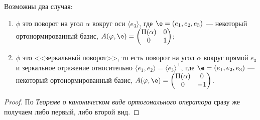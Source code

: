 \begin{Suggestion}
    Возможны два случая:
    
    \begin{enumerate}
        \item $\phi$ это поворот на угол $\alpha$ вокруг оси $\langle e_3 \rangle$, где $\e = (e_1, e_2, e_3)$ --- некоторый ортонормированный базис, $A(\phi, \e) = \begin{pmatrix}
        \Pi(\alpha) & 0 \\
        0 & 1
        \end{pmatrix}$;
        \item $\phi$ это <<зеркальный поворот>>, то есть поворот на угол $\alpha$ вокруг прямой $e_3$ и зеркальное отражение относительно $\langle e_1, e_2\rangle = \langle e_3\rangle^\perp$, где $\e = (e_1, e_2, e_3)$ --- некоторый ортонормированный базис, $A(\phi, \e) = \begin{pmatrix}
        \Pi(\alpha) & 0 \\
        0 & -1
        \end{pmatrix}$.
\end{enumerate}
\end{Suggestion}

\begin{proof}
    По \textit{Теореме о каноническом виде ортогонального оператора} сразу же получаем либо первый, либо второй вид.
\end{proof}


